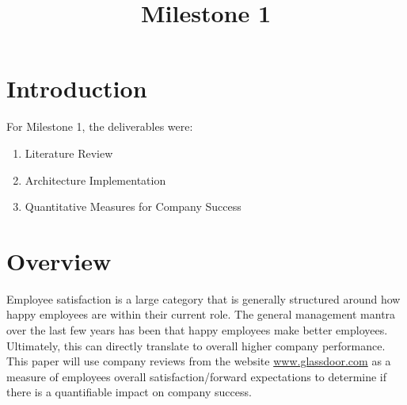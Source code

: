 \documentclass[conference, letterpaper]{IEEEtran}
\begin{document}
%
\title{Milestone 1}


\author{
}


\maketitle







\section{Introduction}
For Milestone 1, the deliverables were:
\begin{enumerate}
\item Literature Review
\item Architecture Implementation
\item Quantitative Measures for Company Success
\end{enumerate}


\section{Overview}
Employee satisfaction is a large category that is generally structured around how happy employees are within their current role.
The general management mantra over the last few years has been that happy employees make better employees.
Ultimately, this can directly translate to overall higher company performance.
This paper will use company reviews from the website \url{www.glassdoor.com} as a measure of employees overall satisfaction/forward expectations to determine if there is a quantifiable impact on company success.
\end{document}
